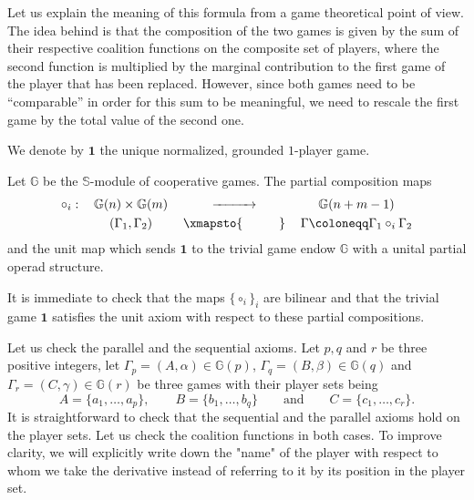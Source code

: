 \documentclass[a4paper,12pt]{amsart}
\begin{document}
\begin{remark}\label{rmk: meaning of the composition}
Let us explain the meaning of this formula from a game theoretical point of view. The idea behind is that the composition of the two games is given by the sum of their respective coalition functions on the composite set of players, where the second function is multiplied by the marginal contribution to the first game of the player that has been replaced. However, since both games need to be ``comparable'' in order for this sum to be meaningful, we need to rescale the first game by the total value of the second one. 
\end{remark}

\begin{notation}
We  denote by $\mathbf{1}$ the unique normalized, grounded $1$-player game.
\end{notation}

\begin{theorem}\label{thm: gamers operad}
Let $\mathbb{G}$ be the $\mathbb{S}$-module of cooperative games. The partial composition maps
\[ 
\begin{tabular}{lccc}
    $\circ_i:$ & $\mathbb{G}(n) \times \mathbb{G}(m)$ & $\xrightarrow{\hspace{1cm}}$ & $\mathbb{G}(n + m - 1)$ \\[0.1cm]
    & $\left( \Gamma_1, \Gamma_2 \right)$ & $\xmapsto{\hspace{1cm}}$ & $\Gamma \coloneqq \Gamma_1 \circ_i \Gamma_2$
\end{tabular} 
\]
and the unit map which sends $\mathbf{1}$ to the trivial game endow $\mathbb{G}$ with a unital partial operad structure. 
\end{theorem}

\proof 
It is immediate to check that the maps $\{\circ_i\}_i$ are bilinear and that the trivial game $\mathbf{1}$ satisfies the unit axiom with respect to these partial compositions. 

\medskip

Let us check the parallel and the sequential axioms. Let $p, q$ and $r$ be three positive integers, let $\Gamma_p = (A, \alpha) \in \mathbb{G}(p)$, $\Gamma_q = (B, \beta) \in \mathbb{G}(q)$ and $\Gamma_r = (C, \gamma) \in \mathbb{G}(r)$ be three games with their player sets being
\[
A = \{a_1, \ldots, a_p\}, \qquad B = \{b_1, \ldots, b_q\} \qquad \text{and} \qquad C = \{c_1, \ldots, c_r\}. 
\]
It is straightforward to check that the sequential and the parallel axioms hold on the player sets. Let us check the coalition functions in both cases. To improve clarity, we will explicitly write down the "name" of the player with respect to whom we take the derivative instead of referring to it by its position in the player set. 
\end{document}

